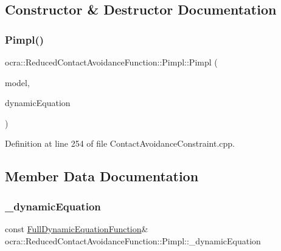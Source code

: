 \subsection{Constructor \& Destructor Documentation}
\hypertarget{structReducedContactAvoidanceFunction_1_1Pimpl_ab7258766eea3fd037b4e59e381adfdd5}{}\label{structReducedContactAvoidanceFunction_1_1Pimpl_ab7258766eea3fd037b4e59e381adfdd5} 
\subsubsection{\texorpdfstring{Pimpl()}{Pimpl()}}
{\footnotesize\ttfamily ocra\+::\+Reduced\+Contact\+Avoidance\+Function\+::\+Pimpl\+::\+Pimpl (\begin{DoxyParamCaption}\item[{const Model \&}]{model,  }\item[{const \hyperlink{classocra_1_1FullDynamicEquationFunction}{Full\+Dynamic\+Equation\+Function} \&}]{dynamic\+Equation }\end{DoxyParamCaption})\hspace{0.3cm}{\ttfamily [inline]}}



Definition at line 254 of file Contact\+Avoidance\+Constraint.\+cpp.



\subsection{Member Data Documentation}
\hypertarget{structReducedContactAvoidanceFunction_1_1Pimpl_a2993139449f5c29b4a85a9e3c261834c}{}\label{structReducedContactAvoidanceFunction_1_1Pimpl_a2993139449f5c29b4a85a9e3c261834c} 
\subsubsection{\texorpdfstring{\+\_\+dynamic\+Equation}{\_dynamicEquation}}
{\footnotesize\ttfamily const \hyperlink{classocra_1_1FullDynamicEquationFunction}{Full\+Dynamic\+Equation\+Function}\& ocra\+::\+Reduced\+Contact\+Avoidance\+Function\+::\+Pimpl\+::\+\_\+dynamic\+Equation}



